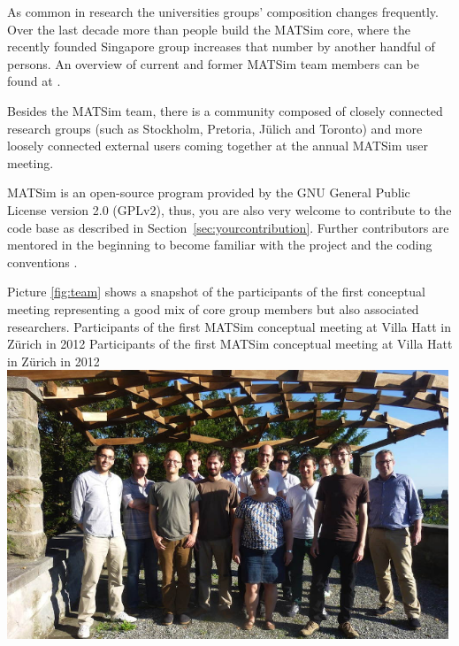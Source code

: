 As common in research the universities groups' composition changes frequently. Over the last decade more than  people build the MATSim core, where the recently founded Singapore group increases that number by another handful of persons. An overview of current and former MATSim team members can be found at .

Besides the MATSim team, there is a community composed of closely connected research groups (such as Stockholm, Pretoria, Jülich and Toronto) and more loosely connected external users coming together at the annual MATSim user meeting.   

MATSim is an open-source program provided by the GNU General Public License version 2.0 (GPLv2), thus, you are also very welcome to contribute to the code base as described in Section~\ref{sec:yourcontribution}. Further contributors are mentored in the beginning \citep[][]{MATSIM-T-BecomingAContributor_Webpage_2014} to become familiar with the project and the coding conventions \citep[][]{MATSIM-T-CodingGuide_Webpage_2014}.

Picture \ref{fig:team} shows a snapshot of the participants of the first conceptual meeting representing a good mix of core group members but also associated researchers.
%
\createfigure%
{Participants of the first MATSim conceptual meeting at Villa Hatt in Zürich in 2012}%
{Participants of the first MATSim conceptual meeting at Villa Hatt in Zürich in 2012}%
{\label{fig:team}}%
{\includegraphics[width=0.99\textwidth, angle=0]{extending/figures/ConceptualMeetingVillaHatt.png}}%
{}

